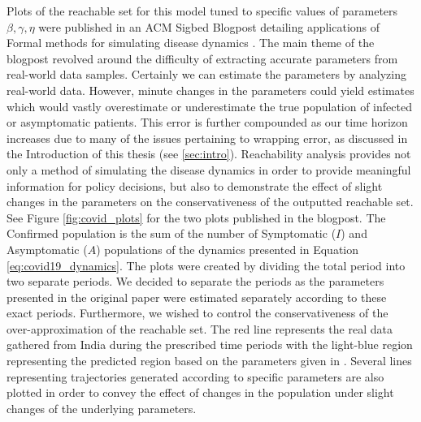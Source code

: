 Plots of the reachable set for this model tuned to specific values of parameters $\beta, \gamma, \eta$ were published in an ACM Sigbed Blogpost detailing applications of Formal methods for simulating disease dynamics \cite{bak2021covid}.
%
The main theme of the blogpost revolved around the difficulty of extracting accurate parameters from real-world data samples.
%
Certainly we can estimate the parameters by analyzing real-world data. However, minute changes in the parameters could yield estimates which would vastly overestimate or underestimate the true population of infected or asymptomatic patients.
%
This error is further compounded as our time horizon increases due to many of the issues pertaining to wrapping error, as discussed in the Introduction of this thesis (see \ref{sec:intro}).
%
Reachability analysis provides not only a method of simulating the disease dynamics in order to provide meaningful information for policy decisions, but also to demonstrate the effect of slight changes in the parameters on the conservativeness of the outputted reachable set.
%
See Figure \ref{fig:covid_plots} for the two plots published in the blogpost. The Confirmed population is the sum of the number of Symptomatic ($I$) and Asymptomatic ($A$) populations of the dynamics presented in Equation \ref{eq:covid19_dynamics}. The plots were created by dividing the total period into two separate periods.
%
We decided to separate the periods as the parameters presented in the original paper \cite{ansumali2020modelling} were estimated separately according to these exact periods. Furthermore, we wished to control the conservativeness of the over-approximation of the reachable set.
%
The red line represents the real data gathered from India during the prescribed time periods with the light-blue region representing the predicted region based on the parameters given in \cite{ansumali2020modelling}.
%
Several lines representing trajectories generated according to specific parameters are also plotted in order to convey the effect of changes in the population under slight changes of the underlying parameters.
%

